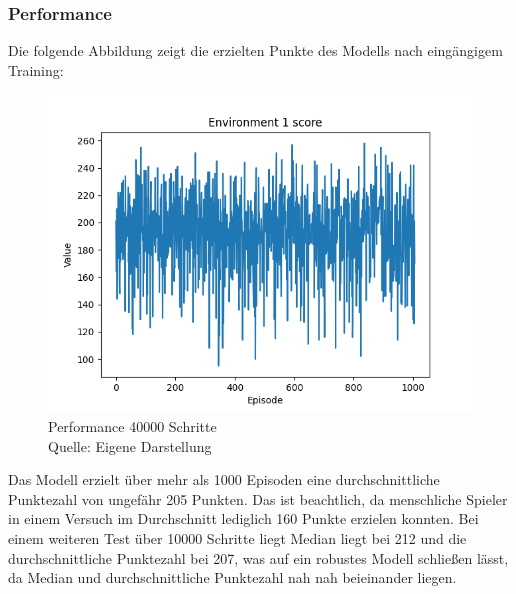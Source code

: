 \subsubsection{Performance}
Die folgende Abbildung zeigt die erzielten Punkte des Modells nach eingängigem Training:
\nopagebreak
\begin{figure}[H]
	\includegraphics[width=1\textwidth]{Bilder/maskableppo_ganzschoenclever_193avg_v3.1} 
	\caption[Performance 40000 Schritte]{Performance 40000 Schritte\\ Quelle: Eigene Darstellung}
\end{figure}

Das Modell erzielt über mehr als 1000 Episoden eine durchschnittliche Punktezahl von ungefähr 205 Punkten. Das ist beachtlich, da menschliche Spieler in einem Versuch im Durchschnitt lediglich 160 Punkte erzielen konnten. Bei einem weiteren Test über 10000 Schritte liegt Median liegt bei 212 und die durchschnittliche Punktezahl bei 207, was auf ein robustes Modell schließen lässt, da Median und durchschnittliche Punktezahl nah nah beieinander liegen.\\

